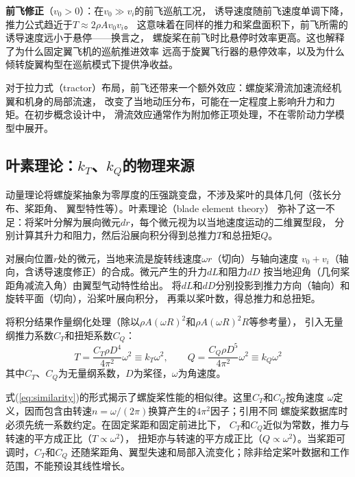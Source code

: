 \textbf{前飞修正}（$v_0 > 0$）：在$v_0 \gg v_i$的前飞巡航工况，
诱导速度随前飞速度单调下降，推力公式趋近于$T \approx 2\rho A v_0 v_i$。
这意味着在同样的推力和桨盘面积下，前飞所需的诱导速度远小于悬停——换言之，
螺旋桨在前飞时比悬停时效率更高。这也解释了为什么固定翼飞机的巡航推进效率
远高于旋翼飞行器的悬停效率，以及为什么倾转旋翼构型在巡航模式下提供净收益。

对于拉力式（tractor）布局，前飞还带来一个额外效应：螺旋桨滑流加速流经机翼和机身的局部流速，
改变了当地动压分布，可能在一定程度上影响升力和力矩。在初步概念设计中，
滑流效应通常作为附加修正项处理，不在零阶动力学模型中展开。

\subsection{叶素理论：\texorpdfstring{$k_T$、$k_Q$}{kT、kQ}的物理来源}

动量理论将螺旋桨抽象为零厚度的压强跳变盘，不涉及桨叶的具体几何（弦长分布、桨距角、
翼型特性等）。叶素理论（blade element theory）\cite{mccormick1995aerodynamics}
弥补了这一不足：将桨叶分解为展向微元$dr$，每个微元视为以当地速度运动的二维翼型段，
分别计算其升力和阻力，然后沿展向积分得到总推力$T$和总扭矩$Q$。

对展向位置$r$处的微元，当地来流是旋转线速度$\omega r$（切向）与轴向速度
$v_0+v_i$（轴向，含诱导速度修正）的合成。微元产生的升力$dL$和阻力$dD$
按当地迎角（几何桨距角减流入角）由翼型气动特性给出。
将$dL$和$dD$分别投影到推力方向（轴向）和旋转平面（切向），沿桨叶展向积分，
再乘以桨叶数，得总推力和总扭矩。

将积分结果作量纲化处理（除以$\rho A (\omega R)^2$和$\rho A (\omega R)^2 R$等参考量），
引入无量纲推力系数$C_T$和扭矩系数$C_Q$：
\begin{equation}
    T = \frac{C_T \rho D^4}{4\pi^2} \omega^2 \equiv k_T \omega^2, \qquad
    Q = \frac{C_Q \rho D^5}{4\pi^2} \omega^2 \equiv k_Q \omega^2
    \label{eq:similarity}
\end{equation}
其中$C_T$、$C_Q$为无量纲系数，$D$为桨径，$\omega$为角速度。

式(\ref{eq:similarity})的形式揭示了螺旋桨性能的相似律。这里$C_T$和$C_Q$按角速度
$\omega$定义，因而包含由转速$n=\omega/(2\pi)$换算产生的$4\pi^2$因子；引用不同
螺旋桨数据库时必须先统一系数约定。在固定桨距和固定前进比下，
$C_T$和$C_Q$近似为常数，推力与转速的平方成正比（$T \propto \omega^2$），
扭矩亦与转速的平方成正比（$Q \propto \omega^2$）。当桨距可调时，$C_T$和$C_Q$
还随桨距角、翼型失速和局部入流变化；除非给定桨叶数据和工作范围，不能预设其线性增长。

